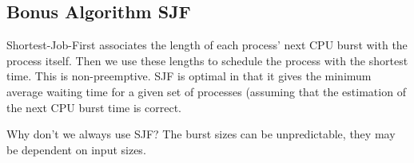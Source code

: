 \documentclass{article}
\begin{document}
\subsection{Bonus Algorithm SJF}
Shortest-Job-First associates the length of each process' next CPU burst with the process itself.
Then we use these lengths to schedule the process with the shortest time.
This is non-preemptive.
SJF is optimal in that it gives the minimum average waiting time for a given set of processes (assuming that the estimation of the next CPU burst time is correct.

Why don't we always use SJF?
The burst sizes can be unpredictable, they may be dependent on input sizes.
\end{document}
